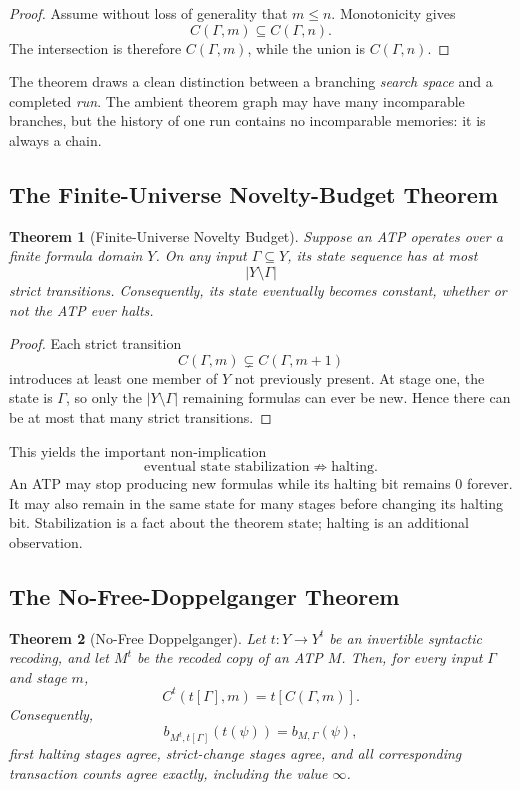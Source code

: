 \documentclass[11pt,letterpaper]{article}
\theoremstyle{named}
\newtheorem{theorem}{Theorem}[section]
\begin{document}
\begin{proof}
Assume without loss of generality that $m\le n$. Monotonicity gives
\[
C(\Gamma,m)\subseteq C(\Gamma,n).
\]
The intersection is therefore $C(\Gamma,m)$, while the union is $C(\Gamma,n)$.
\end{proof}

The theorem draws a clean distinction between a branching \emph{search space} and a completed \emph{run}. The ambient theorem graph may have many incomparable branches, but the history of one run contains no incomparable memories: it is always a chain.

\subsection{The Finite-Universe Novelty-Budget Theorem}

\begin{theorem}[Finite-Universe Novelty Budget]
Suppose an ATP operates over a finite formula domain $Y$. On any input $\Gamma\subseteq Y$, its state sequence has at most
\[
|Y\setminus\Gamma|
\]
strict transitions. Consequently, its state eventually becomes constant, whether or not the ATP ever halts.
\end{theorem}

\begin{proof}
Each strict transition
\[
C(\Gamma,m)\subsetneq C(\Gamma,m+1)
\]
introduces at least one member of $Y$ not previously present. At stage one, the state is $\Gamma$, so only the $|Y\setminus\Gamma|$ remaining formulas can ever be new. Hence there can be at most that many strict transitions.
\end{proof}

This yields the important non-implication
\[
\text{eventual state stabilization}
\not\Longrightarrow
\text{halting}.
\]
An ATP may stop producing new formulas while its halting bit remains $0$ forever. It may also remain in the same state for many stages before changing its halting bit. Stabilization is a fact about the theorem state; halting is an additional observation.

\subsection{The No-Free-Doppelganger Theorem}

\begin{theorem}[No-Free Doppelganger]
Let $t:Y\to Y^t$ be an invertible syntactic recoding, and let $M^t$ be the recoded copy of an ATP $M$. Then, for every input $\Gamma$ and stage $m$,
\[
C^t(t[\Gamma],m)=t[C(\Gamma,m)].
\]
Consequently,
\[
b_{M^t,t[\Gamma]}(t(\psi))
=
b_{M,\Gamma}(\psi),
\]
first halting stages agree, strict-change stages agree, and all corresponding transaction counts agree exactly, including the value $\infty$.
\end{theorem}
\end{document}
